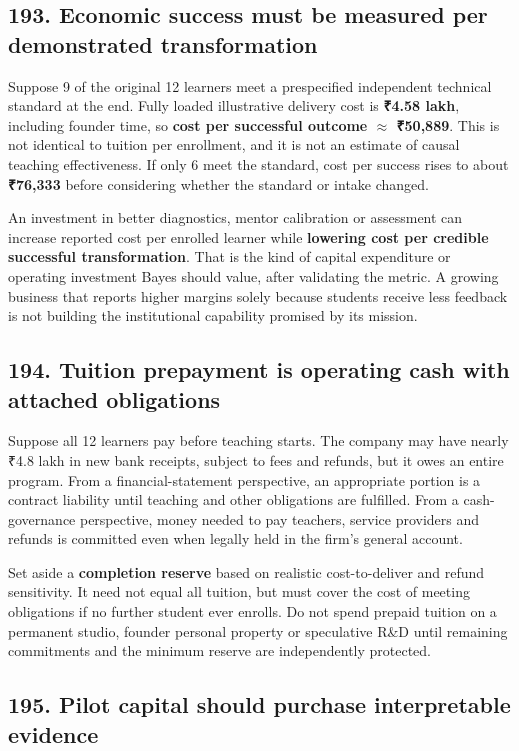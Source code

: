\subsection{193. Economic success must be measured per demonstrated transformation}


Suppose 9 of the original 12 learners meet a prespecified independent technical standard at the end. Fully loaded illustrative delivery cost is \textbf{₹4.58 lakh}, including founder time, so \textbf{cost per successful outcome $\approx$ ₹50,889}. This is not identical to tuition per enrollment, and it is not an estimate of causal teaching effectiveness. If only 6 meet the standard, cost per success rises to about \textbf{₹76,333} before considering whether the standard or intake changed.

An investment in better diagnostics, mentor calibration or assessment can increase reported cost per enrolled learner while \textbf{lowering cost per credible successful transformation}. That is the kind of capital expenditure or operating investment Bayes should value, after validating the metric. A growing business that reports higher margins solely because students receive less feedback is not building the institutional capability promised by its mission.

\subsection{194. Tuition prepayment is operating cash with attached obligations}


Suppose all 12 learners pay before teaching starts. The company may have nearly ₹4.8 lakh in new bank receipts, subject to fees and refunds, but it owes an entire program. From a financial-statement perspective, an appropriate portion is a contract liability until teaching and other obligations are fulfilled. From a cash-governance perspective, money needed to pay teachers, service providers and refunds is committed even when legally held in the firm's general account.

Set aside a \textbf{completion reserve} based on realistic cost-to-deliver and refund sensitivity. It need not equal all tuition, but must cover the cost of meeting obligations if no further student ever enrolls. Do not spend prepaid tuition on a permanent studio, founder personal property or speculative R\&D until remaining commitments and the minimum reserve are independently protected.

\subsection{195. Pilot capital should purchase interpretable evidence}


